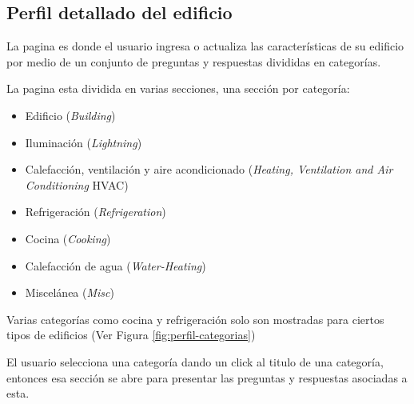 \subsection{Perfil detallado del edificio}

La pagina  es donde el usuario
ingresa o actualiza las características de su edificio por medio de un
conjunto de preguntas y respuestas divididas en categorías.

La pagina esta dividida en varias secciones, una sección por categoría:
\begin{itemize}
\item Edificio (\textit{Building})
\item Iluminación (\textit{Lightning})
\item Calefacción, ventilación y aire acondicionado (\textit{Heating, Ventilation and Air Conditioning} HVAC)
\item Refrigeración (\textit{Refrigeration})
\item Cocina (\textit{Cooking})
\item Calefacción de agua (\textit{Water-Heating})
\item Miscelánea (\textit{Misc})
\end{itemize}

Varias categorías como cocina y refrigeración solo son mostradas
para ciertos tipos de edificios (Ver Figura \ref{fig:perfil-categorias})


El usuario selecciona una categoría dando un click al titulo de una categoría,
entonces esa sección se abre para presentar las preguntas y respuestas
asociadas a esta.

